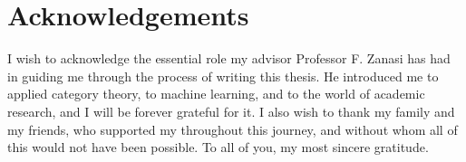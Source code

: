 \documentclass[12pt,a4paper,openright,twoside]{report}
\theoremstyle{plain}
\theoremstyle{definition}
\begin{document}


{\footnotesize }



\clearpage{\pagestyle{empty}\cleardoublepage}





\chapter*{Acknowledgements}

\thispagestyle{empty}

I wish to acknowledge the essential role my advisor Professor F. Zanasi has had in guiding me through the process of writing this thesis. He introduced me to applied category theory, to machine learning, and to the world of academic research, and I will be forever grateful for it. I also wish to thank my family and my friends, who supported my throughout this journey, and without whom all of this would not have been possible. To all of you, my most sincere gratitude.
\end{document}
